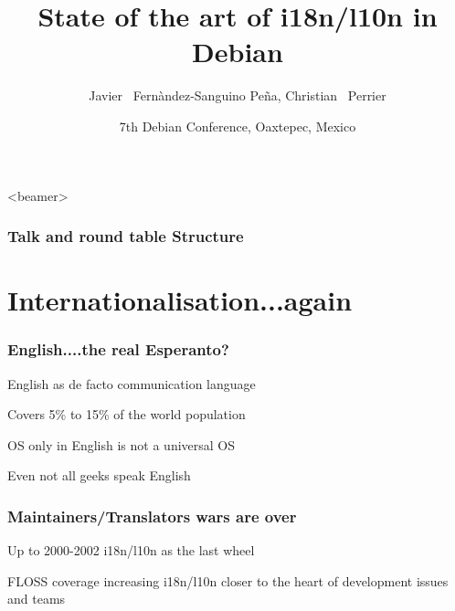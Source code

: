 \documentclass{beamer}
\title[State of the art of i18n/l10n in Debian] 
{State of the art of i18n/l10n in Debian}
\author[jfs, bubulle] 
{Javier ~Fernàndez-Sanguino Peña, Christian ~Perrier}
\date[Debconf 6] 
{7th Debian Conference, Oaxtepec, Mexico}
\begin{document}
\frame{\titlepage}

\begin{frame}<beamer>
    \frametitle{Talk and round table Structure}
    \tableofcontents[subsectionstyle=hide]
\end{frame}

\section{Internationalisation...again}


\begin{frame}
  \frametitle{English....the real Esperanto?}
	\begin{block}
		{English as de facto communication language}
	\end{block}
	\begin{block}
		{Covers 5\% to 15\% of the world population}
	\end{block}
	\begin{block}
		{OS only in English is not a universal OS}
	\end{block}
	\begin{block}
		{Even not all geeks speak English}
	\end{block}
\end{frame}

\begin{frame}
  \frametitle{Maintainers/Translators wars are over}
	\begin{block}
		{Up to 2000-2002}
		i18n/l10n as the last wheel
	\end{block}
	\begin{block}
		{FLOSS coverage increasing}
		i18n/l10n closer to the heart of development issues and teams
	\end{block}
\end{frame}
\end{document}
